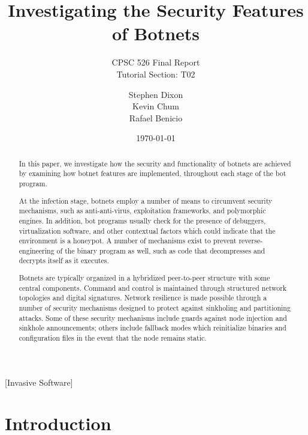 \documentclass{acm_proc_article-sp}
\begin{document}
\title{Investigating the Security Features of Botnets}
\subtitle{CPSC 526 Final Report \\ Tutorial Section: T02}
\date{\today}
\author{
\alignauthor
Stephen Dixon\\
\alignauthor
Kevin Chum\\
\alignauthor
Rafael Benicio\\
}

\maketitle

\begin{abstract}

In this paper, we investigate how the security and functionality of botnets are achieved by examining how botnet features are implemented, throughout each stage of the bot program.

At the infection stage, botnets employ a number of means to circumvent security mechanisms, such as anti-anti-virus, exploitation frameworks, and polymorphic engines.  In addition, bot programs usually check for the presence of debuggers, virtualization software, and other contextual factors which could indicate that the environment is a honeypot.  A number of mechanisms exist to prevent reverse-engineering of the binary program as well, such as code that decompresses and decrypts itself as it executes.

Botnets are typically organized in a hybridized peer-to-peer structure with some central components.  Command and control is maintained through structured network topologies and digital signatures.  Network resilience is made possible through a number of security mechanisms designed to protect against sinkholing and partitioning attacks.  Some of these security mechanisms include guards against node injection and sinkhole announcements; others include fallback modes which reinitialize binaries and configuration files in the event that the node remains static.


\end{abstract}
[Invasive Software]

\newpage
\section{Introduction}
\end{document}
